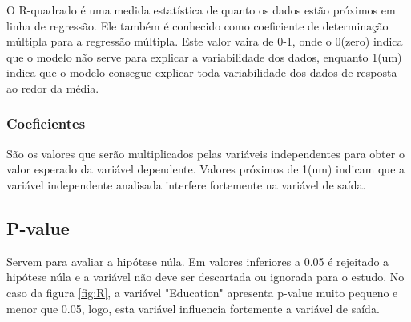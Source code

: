 O R-quadrado é uma medida estatística de quanto os dados estão próximos em linha de regressão. Ele também é conhecido como coeficiente de determinação múltipla para a regressão múltipla. Este valor vaira de 0-1, onde o 0(zero) indica que o modelo não serve para explicar a variabilidade dos dados, enquanto 1(um) indica que o modelo consegue explicar toda variabilidade dos dados de resposta ao redor da média\cite{5}. 

\subsubsection*{Coeficientes}

São os valores que serão multiplicados pelas variáveis independentes para obter o valor esperado da variável dependente. Valores próximos de 1(um) indicam que a variável independente analisada interfere fortemente na variável de saída\cite{5}. 

\subsection*{P-value}

Servem para avaliar a hipótese núla. Em valores inferiores a 0.05 é rejeitado a hipótese núla e a variável não deve ser descartada ou ignorada para o estudo. No caso da figura \ref*{fig:R}, a variável "Education" apresenta p-value muito pequeno e menor que 0.05, logo, esta variável influencia fortemente a variável de saída\cite{5}.

